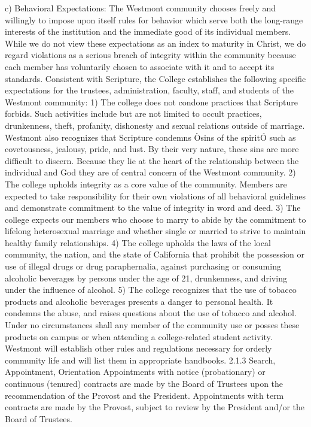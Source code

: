 \documentclass[letterpaper, 11pt]{article}
\begin{document}
c) Behavioral Expectations:
   The Westmont community chooses freely and willingly to impose upon itself rules for behavior which serve both the long-range interests of the institution and the immediate good of its individual members.  While we do not view these expectations as an index to maturity in Christ, we do regard violations as a serious breach of integrity within the community because each member has voluntarily chosen to associate with it and to accept its standards.
   Consistent with Scripture, the College establishes the following specific expectations for the trustees, administration, faculty, staff, and students of the Westmont community:
1) The college does not condone practices that Scripture forbids.  Such activities include but are not limited to occult practices, drunkenness, theft, profanity, dishonesty and sexual relations outside of marriage.  Westmont also recognizes that Scripture condemns Òsins of the spiritÓ such as covetousness, jealousy, pride, and lust.  By their very nature, these sins are more difficult to discern.  Because they lie at the heart of the relationship between the individual and God they are of central concern of the Westmont community.
2) The college upholds integrity as a core value of the community.  Members are expected to take responsibility for their own violations of all behavioral guidelines and demonstrate commitment to the value of integrity in word and deed.
3) The college expects our members who choose to marry to abide by the commitment to lifelong heterosexual marriage and whether single or married to strive to maintain healthy family relationships.
4) The college upholds the laws of the local community, the nation, and the state of California that prohibit the possession or use of illegal drugs or drug paraphernalia, against purchasing or consuming alcoholic beverages by persons under the age of 21, drunkenness, and driving under the influence of alcohol.
5) The college recognizes that the use of tobacco products and alcoholic beverages presents a danger to personal health.  It condemns the abuse, and raises questions about the use of tobacco and alcohol.  Under no circumstances shall any member of the community use or posses these products on campus or when attending a college-related student activity.
   Westmont will establish other rules and regulations necessary for orderly community life and will list them in appropriate handbooks. 
2.1.3 Search, Appointment, Orientation
   Appointments with notice (probationary) or continuous (tenured) contracts are made by the Board of Trustees upon the recommendation of the Provost and the President. Appointments with term contracts are made by the Provost, subject to review by the President and/or the Board of Trustees.
\end{document}
